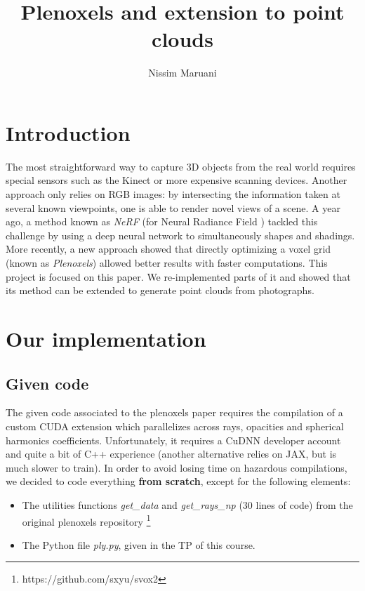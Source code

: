\documentclass{article}
\title{Plenoxels and extension to point clouds}
\author{Nissim Maruani}
\begin{document}
\maketitle

\begin{abstract}
\cite{plenoxels}
\cite{nerf}
\cite{spacecarving}

\cite{directvoxgo}
\cite{instant}
\end{abstract}

\section{Introduction}

The most straightforward way to capture 3D objects from the real world requires special sensors such as the Kinect or more expensive scanning devices. Another approach only relies on RGB images: by intersecting the information taken at several known viewpoints, one is able to render novel views of a scene. A year ago, a method known as \textit{NeRF} (for Neural Radiance Field \cite{nerf}) tackled this challenge by using a deep neural network to simultaneously shapes and shadings. More recently, a new approach \cite{plenoxels} showed that directly optimizing a voxel grid (known as \textit{Plenoxels}) allowed better results with faster computations. This project is focused on this paper. We re-implemented parts of it and showed that its method can be extended to generate point clouds from photographs.  

\section{Our implementation}

\subsection{Given code}


The given code associated to the plenoxels paper requires the compilation of a custom CUDA extension which parallelizes across rays, opacities and spherical harmonics coefficients. Unfortunately, it requires a CuDNN developer account and quite a bit of C++ experience (another alternative relies on JAX, but is much slower to train). In order to avoid losing time on hazardous compilations, we decided to code everything \textbf{from scratch}, except for the following elements:
\begin{itemize}
\item The utilities functions \textit{get\_data} and \textit{get\_rays\_np} (30 lines of code) from the original plenoxels repository \footnote{https://github.com/sxyu/svox2}

\item The Python file \textit{ply.py}, given in the TP of this course.  

\end{itemize}
\end{document}
